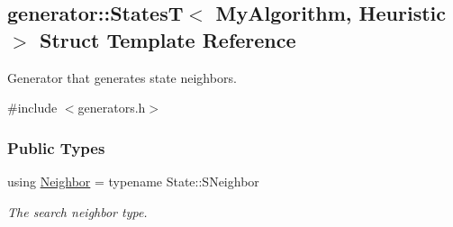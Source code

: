 \hypertarget{structgenerator_1_1StatesT}{}\subsection{generator\+:\+:StatesT$<$ My\+Algorithm, Heuristic $>$ Struct Template Reference}
\label{structgenerator_1_1StatesT}


Generator that generates state neighbors.  




{\ttfamily \#include $<$generators.\+h$>$}

\subsubsection*{Public Types}
\begin{DoxyCompactItemize}
\item 
using \hyperlink{structgenerator_1_1StatesT_a3b9228d58aefe6f1685de405e80bf893}{Neighbor} = typename State\+::\+S\+Neighbor\hypertarget{structgenerator_1_1StatesT_a3b9228d58aefe6f1685de405e80bf893}{}\label{structgenerator_1_1StatesT_a3b9228d58aefe6f1685de405e80bf893}

\begin{DoxyCompactList}\small\item\em The search neighbor type. \end{DoxyCompactList}\end{DoxyCompactItemize}
